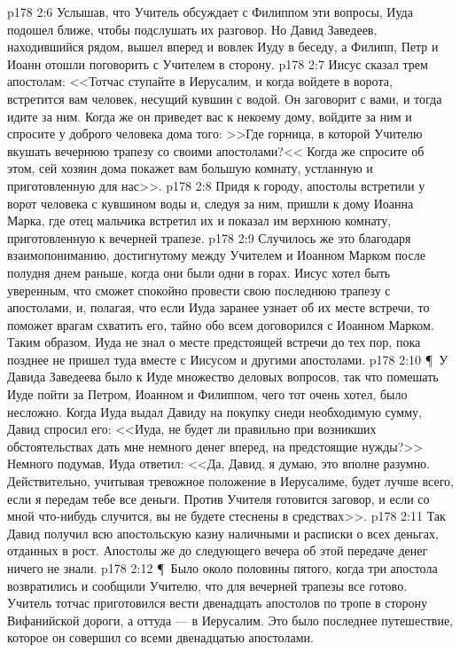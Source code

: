 \vs p178 2:6 Услышав, что Учитель обсуждает с Филиппом эти вопросы, Иуда подошел ближе, чтобы подслушать их разговор. Но Давид Заведеев, находившийся рядом, вышел вперед и вовлек Иуду в беседу, а Филипп, Петр и Иоанн отошли поговорить с Учителем в сторону.
\vs p178 2:7 Иисус сказал трем апостолам: <<Тотчас ступайте в Иерусалим, и когда войдете в ворота, встретится вам человек, несущий кувшин с водой. Он заговорит с вами, и тогда идите за ним. Когда же он приведет вас к некоему дому, войдите за ним и спросите у доброго человека дома того: >>Где горница, в которой Учителю вкушать вечернюю трапезу со своими апостолами?<< Когда же спросите об этом, сей хозяин дома покажет вам большую комнату, устланную и приготовленную для нас>>.
\vs p178 2:8 Придя к городу, апостолы встретили у ворот человека с кувшином воды и, следуя за ним, пришли к дому Иоанна Марка, где отец мальчика встретил их и показал им верхнюю комнату, приготовленную к вечерней трапезе.
\vs p178 2:9 Случилось же это благодаря взаимопониманию, достигнутому между Учителем и Иоанном Марком после полудня днем раньше, когда они были одни в горах. Иисус хотел быть уверенным, что сможет спокойно провести свою последнюю трапезу с апостолами, и, полагая, что если Иуда заранее узнает об их месте встречи, то поможет врагам схватить его, тайно обо всем договорился с Иоанном Марком. Таким образом, Иуда не знал о месте предстоящей встречи до тех пор, пока позднее не пришел туда вместе с Иисусом и другими апостолами.
\vs p178 2:10 \P\ У Давида Заведеева было к Иуде множество деловых вопросов, так что помешать Иуде пойти за Петром, Иоанном и Филиппом, чего тот очень хотел, было несложно. Когда Иуда выдал Давиду на покупку снеди необходимую сумму, Давид спросил его: <<Иуда, не будет ли правильно при возникших обстоятельствах дать мне немного денег вперед, на предстоящие нужды?>> Немного подумав, Иуда ответил: <<Да, Давид, я думаю, это вполне разумно. Действительно, учитывая тревожное положение в Иерусалиме, будет лучше всего, если я передам тебе все деньги. Против Учителя готовится заговор, и если со мной что\hyp{}нибудь случится, вы не будете стеснены в средствах>>.
\vs p178 2:11 Так Давид получил всю апостольскую казну наличными и расписки о всех деньгах, отданных в рост. Апостолы же до следующего вечера об этой передаче денег ничего не знали.
\vs p178 2:12 \P\ Было около половины пятого, когда три апостола возвратились и сообщили Учителю, что для вечерней трапезы все готово. Учитель тотчас приготовился вести двенадцать апостолов по тропе в сторону Вифанийской дороги, а оттуда --- в Иерусалим. Это было последнее путешествие, которое он совершил со всеми двенадцатью апостолами.
